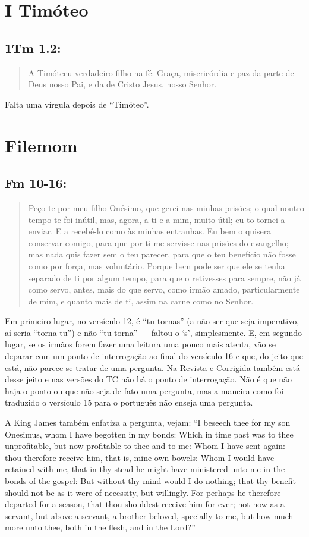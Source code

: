 \section{I Timóteo}
\subsection{1Tm 1.2:}
\begin{quote}
    \small
A Timóteeu verdadeiro filho na fé: Graça,
misericórdia e paz da parte de Deus nosso Pai, e da de Cristo Jesus, nosso
Senhor.
\end{quote}

Falta uma vírgula depois de ``Timóteo''.

\section{Filemom}
\subsection{Fm 10-16:}
\begin{quote}
    \small
Peço-te por meu filho Onésimo, que gerei nas minhas prisões; o qual noutro tempo te foi inútil, mas, agora, a ti e a mim, muito útil; eu to tornei a enviar. E  a recebê-lo como às minhas entranhas. Eu bem o quisera conservar comigo, para que por ti me servisse nas prisões do evangelho; mas nada quis fazer sem o teu parecer, para que o teu benefício não fosse como por força, mas voluntário. Porque bem pode ser que ele se tenha separado de ti por algum tempo, para que o retivesses para sempre, não já como servo, antes, mais do que servo, como irmão amado, particularmente de mim, e quanto mais de ti, assim na carne como no Senhor.
\end{quote}

Em primeiro lugar, no versículo 12, é ``tu tornas'' (a não ser que seja imperativo, aí seria ``torna tu'') e não ``tu torna'' --- faltou o `s', simplesmente. E, em segundo lugar, se os irmãos forem fazer uma leitura uma pouco mais atenta, vão se deparar com um ponto de interrogação ao final do versículo 16 e que, do jeito que está, não parece se tratar de uma pergunta. Na Revista e Corrigida também está
desse jeito e nas versões do TC não há o ponto de interrogação. Não é que não haja o ponto ou que não seja de fato uma pergunta, mas a maneira como foi traduzido o versículo 15 para o português não enseja uma pergunta.

A King James também enfatiza a pergunta, vejam: ``I beseech thee for my son Onesimus, whom I have begotten in my bonds: Which in time past was to thee unprofitable, but now profitable to thee and to me: Whom I have sent again: thou therefore receive him, that is, mine own bowels: Whom I would have retained with me, that in thy stead he might have ministered unto me in the bonds of the gospel: But without thy mind would I do nothing; that thy benefit should not be as it were of
necessity, but willingly. For perhaps he therefore departed for a season, that thou shouldest receive him for ever; not now as a servant, but above a servant, a brother beloved, specially to me, but how much more unto thee, both in the flesh, and in the Lord?''

